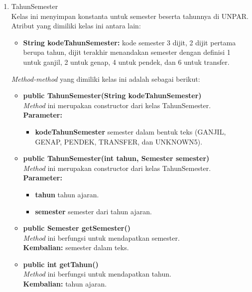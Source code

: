 \begin{enumerate}
\begin{enumerate}
		\item TahunSemester\\
		Kelas ini menyimpan konstanta untuk semester beserta tahunnya di UNPAR. Atribut yang dimiliki kelas ini antara lain:
		\begin{itemize}
			\item \textbf{String kodeTahunSemester:} kode semester 3 dijit, 2 dijit pertama berupa tahun, dijit terakhir menandakan semester dengan definisi 1 untuk ganjil, 2 untuk genap, 4 untuk pendek, dan 6 untuk transfer.
		\end{itemize}
		\textit{Method-method} yang dimiliki kelas ini adalah sebagai berikut:
		\begin{itemize}
			\item \textbf{public TahunSemester(String kodeTahunSemester)} \\
			\textit{Method} ini merupakan constructor dari kelas TahunSemester. \\
			\textbf{Parameter:}
			\begin{itemize}
				\item \textbf{kodeTahunSemester} semester dalam bentuk teks (GANJIL, GENAP, PENDEK, TRANSFER, dan UNKNOWN5).
			\end{itemize}
			
			\item \textbf{public TahunSemester(int tahun, Semester semester)} \\
			\textit{Method} ini merupakan constructor dari kelas TahunSemester. \\
			\textbf{Parameter:}
			\begin{itemize}
				\item \textbf{tahun} tahun ajaran.
				\item \textbf{semester} semester dari tahun ajaran.
			\end{itemize}
			
			\item \textbf{public Semester getSemester()} \\
			\textit{Method} ini berfungsi untuk mendapatkan semester. \\
			\textbf{Kembalian:} semester dalam teks.
			
			\item \textbf{public int getTahun()} \\
			\textit{Method} ini berfungsi untuk mendapatkan tahun. \\
			\textbf{Kembalian:} tahun ajaran.
			

\end{itemize}
\end{enumerate}
\end{enumerate}
